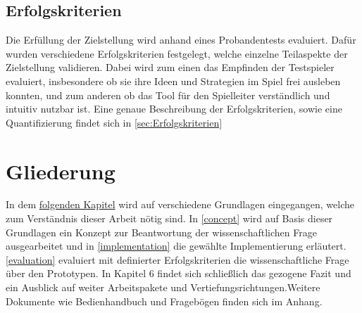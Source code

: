 \subsection{Erfolgskriterien}
\label{sec:Erfolgskriterien_ziel}

Die Erfüllung der Zielstellung wird anhand eines Probandentests evaluiert. Dafür wurden verschiedene Erfolgskriterien festgelegt, welche einzelne Teilaspekte der Zielstellung validieren. Dabei wird zum einen das Empfinden der Testspieler evaluiert, insbesondere ob sie ihre Ideen und Strategien im Spiel frei ausleben konnten, und zum anderen ob das Tool für den  Spielleiter verständlich und intuitiv nutzbar ist. Eine genaue Beschreibung der Erfolgskriterien, sowie eine Quantifizierung findet sich in \ref{sec:Erfolgskriterien}

  
\section{Gliederung}
\label{sec:Gliederung}
In dem \hyperref[background]{folgenden Kapitel} wird auf verschiedene Grundlagen eingegangen, welche zum Verständnis dieser Arbeit nötig sind. In \ref{concept} wird auf Basis dieser Grundlagen ein Konzept zur Beantwortung der wissenschaftlichen Frage ausgearbeitet und in \ref{implementation} die gewählte Implementierung erläutert.\newline \ref{evaluation} evaluiert mit definierter Erfolgskriterien die wissenschaftliche Frage über den Prototypen. In Kapitel 6 findet sich schließlich das gezogene Fazit und ein Ausblick auf weiter Arbeitspakete und Vertiefungsrichtungen.\newline Weitere Dokumente wie Bedienhandbuch und Fragebögen finden sich im Anhang.

